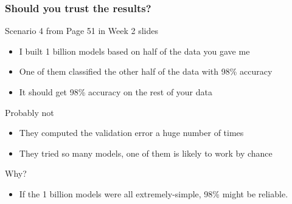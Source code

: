 \documentclass[aspectratio=169, 10pt]{beamer}
\begin{document}
\begin{frame}
    \frametitle{Should you trust the results?}
    
    Scenario 4 from Page 51 in Week 2 slides

    \begin{itemize}
        \item I built 1 billion models based on half of the data you gave me
        \item One of them classified the other half of the data with 98\% accuracy
        \item It should get 98\% accuracy on the rest of your data
    \end{itemize}

    Probably not

    \begin{itemize}
        \item They computed the validation error a huge number of times
        \item They tried so many models, one of them is likely to work by chance
    \end{itemize}

    Why?

    \begin{itemize}
        \item If the 1 billion models were all extremely-simple, 98\% might be reliable.
    \end{itemize}

\end{frame}
\end{document}
